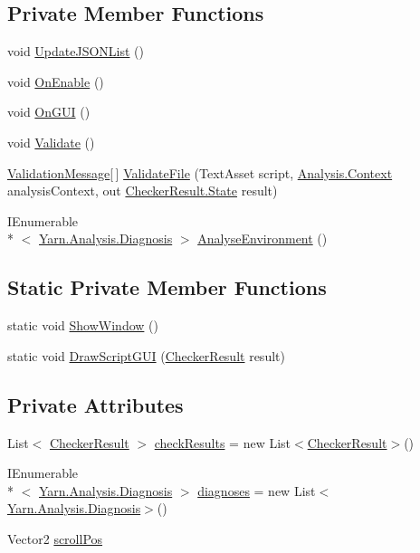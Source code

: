 \subsection*{Private Member Functions}
\begin{DoxyCompactItemize}
\item 
void \hyperlink{a00085_a8b798cbc0fad966781e9cc0de177fbd9}{Update\-J\-S\-O\-N\-List} ()
\item 
void \hyperlink{a00085_aeba1f39189758bd91bdce298e8859947}{On\-Enable} ()
\item 
void \hyperlink{a00085_aec84840262ae8fd7d84605778de1dc39}{On\-G\-U\-I} ()
\item 
void \hyperlink{a00085_ac4dbc30419c5647c1a2587b2ff7abd7c}{Validate} ()
\item 
\hyperlink{a00085_d9/d38/a00166}{Validation\-Message}\mbox{[}$\,$\mbox{]} \hyperlink{a00085_a6f2bf42b228ea29c6477e369226db8b6}{Validate\-File} (Text\-Asset script, \hyperlink{a00031}{Analysis.\-Context} analysis\-Context, out \hyperlink{a00024_ab24848d7951ce44eb3c7768c6ee10385}{Checker\-Result.\-State} result)
\item 
I\-Enumerable\\*
$<$ \hyperlink{a00035}{Yarn.\-Analysis.\-Diagnosis} $>$ \hyperlink{a00085_a9c207786c349120dc439bdce53072191}{Analyse\-Environment} ()
\end{DoxyCompactItemize}
\subsection*{Static Private Member Functions}
\begin{DoxyCompactItemize}
\item 
static void \hyperlink{a00085_a2084e2ce6ccf18094a992985aa5330fb}{Show\-Window} ()
\item 
static void \hyperlink{a00085_a1a7e1a855bb2a9549eb1c0eb292c9b85}{Draw\-Script\-G\-U\-I} (\hyperlink{a00024}{Checker\-Result} result)
\end{DoxyCompactItemize}
\subsection*{Private Attributes}
\begin{DoxyCompactItemize}
\item 
List$<$ \hyperlink{a00024}{Checker\-Result} $>$ \hyperlink{a00085_aa85ab7bd194e5425b991b9c216d4d10e}{check\-Results} = new List$<$\hyperlink{a00024}{Checker\-Result}$>$()
\item 
I\-Enumerable\\*
$<$ \hyperlink{a00035}{Yarn.\-Analysis.\-Diagnosis} $>$ \hyperlink{a00085_ab4784aaee761b7c60bb142cd410eb774}{diagnoses} = new List$<$\hyperlink{a00035}{Yarn.\-Analysis.\-Diagnosis}$>$()
\item 
Vector2 \hyperlink{a00085_a2d9b9702b0980af9d4202aebd440124b}{scroll\-Pos}
\end{DoxyCompactItemize}


